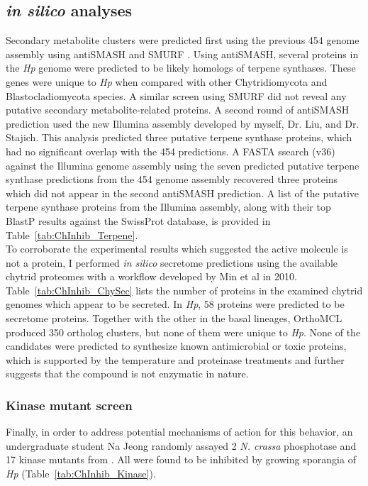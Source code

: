 \subsection*{\textit{in silico} analyses}
Secondary metabolite clusters were predicted first using the previous 454 genome assembly using antiSMASH \cite{Blin2013} and SMURF \cite{Khaldi2010}. Using antiSMASH, several proteins in the \textit{Hp} genome were predicted to be likely homologs of terpene synthases. These genes were unique to \textit{Hp} when compared with other Chytridiomycota and Blastocladiomycota species. A similar screen using SMURF did not reveal any putative secondary metabolite-related proteins. A second round of antiSMASH prediction used the new Illumina assembly developed by myself, Dr. Liu, and Dr. Stajich. This analysis predicted three putative terpene synthase proteins, which had no significant overlap with the 454 predictions. A FASTA ssearch (v36) against the Illumina genome assembly using the seven predicted putative terpene synthase predictions from the 454 genome assembly recovered three proteins which did not appear in the second antiSMASH prediction. A list of the putative terpene synthase proteins from the Illumina assembly, along with their top BlastP results against the SwissProt database, is provided in Table~\ref{tab:ChInhib_Terpene}.\\
\indent To corroborate the experimental results which suggested the active molecule is not a protein, I performed \textit{in silico} secretome predictions using the available chytrid proteomes with a workflow developed by Min et al in 2010. Table~\ref{tab:ChInhib_ChySec} lists the number of proteins in the examined chytrid genomes which appear to be secreted. In \textit{Hp}, 58 proteins were predicted to be secretome proteins. Together with the other in the basal lineages, OrthoMCL produced 350 ortholog clusters, but none of them were unique to \textit{Hp}. None of the candidates were predicted to synthesize known antimicrobial or toxic proteins, which is supported by the temperature and proteinase treatments and further suggests that the compound is not enzymatic in nature.\\
\subsubsection*{Kinase mutant screen}
Finally, in order to address potential mechanisms of action for this behavior, an undergraduate student Na Jeong randomly assayed 2 \textit{N. crassa} phosphotase and 17 kinase mutants from \cite{Park2011}. All were found to be inhibited by growing sporangia of \textit{Hp} (Table~\ref{tab:ChInhib_Kinase}).\\

